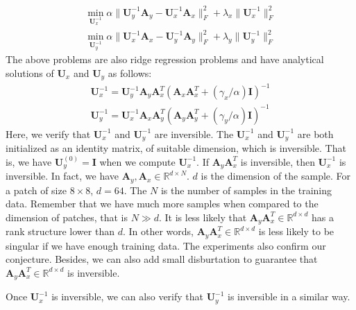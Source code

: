 \documentclass[10pt,twocolumn,letterpaper]{article}
\begin{document}
\begin{equation}
\begin{split}
\min_{\mathbf{U}_{x}^{-1}}
\alpha
\|\mathbf{U}_{y}^{-1}\mathbf{A}_{y}-\mathbf{U}_{x}^{-1}\mathbf{A}_{x}\|_{F}^{2}
+
\lambda_{x}\|\mathbf{U}_{x}^{-1}\|_{F}^{2}
\\
\min_{\mathbf{U}_{y}^{-1}}
\alpha
\|\mathbf{U}_{x}^{-1}\mathbf{A}_{x}-\mathbf{U}_{y}^{-1}\mathbf{A}_{y}\|_{F}^{2}
+
\lambda_{y}\|\mathbf{U}_{y}^{-1}\|_{F}^{2}
\end{split}
\end{equation}
The above problems are also ridge regression problems and have analytical solutions of $\mathbf{U}_{x}$ and $\mathbf{U}_{y}$ as follows:
\begin{equation}
\begin{split}
\mathbf{U}_{x}^{-1} = \mathbf{U}_{y}^{-1}\mathbf{A}_{y}\mathbf{A}_{x}^{T}(\mathbf{A}_{x}\mathbf{A}_{x}^{T}+(\gamma_{x}/\alpha)\mathbf{I})^{-1}
\\
\mathbf{U}_{y}^{-1} = \mathbf{U}_{x}^{-1}\mathbf{A}_{x}\mathbf{A}_{y}^{T}(\mathbf{A}_{y}\mathbf{A}_{y}^{T}+(\gamma_{y}/\alpha)\mathbf{I})^{-1}
\end{split}
\end{equation}
Here, we verify that $\mathbf{U}_{x}^{-1}$ and $\mathbf{U}_{y}^{-1}$ are inversible. The $\mathbf{U}_{x}^{-1}$ and $\mathbf{U}_{y}^{-1}$ are both initialized as an identity matrix, of suitable dimension, which is inversible. That is, we have $\mathbf{U}_{y}^{(0)} = \mathbf{I}$ when we compute $\mathbf{U}_{x}^{-1}$. If $\mathbf{A}_{y}\mathbf{A}_{x}^{T}$ is inversible, then $\mathbf{U}_{x}^{-1}$ is inversible. In fact, we have $\mathbf{A}_{y},\mathbf{A}_{x}\in \mathbb{R}^{d\times N}$. $d$ is the dimension of the sample. For a patch of size $8\times8$, $d=64$. The $N$ is the number of samples in the training data. Remember that we have much more samples when compared to the dimension of patches, that is $N\gg d$. It is less likely that  $\mathbf{A}_{y}\mathbf{A}_{x}^{T}\in \mathbb{R}^{d\times d}$ has a rank structure lower than $d$. In other words,  $\mathbf{A}_{y}\mathbf{A}_{x}^{T}\in \mathbb{R}^{d\times d}$ is less likely to be singular if we have enough training data. The experiments also confirm our conjecture. Besides, we can also add small disburtation to guarantee that $\mathbf{A}_{y}\mathbf{A}_{x}^{T}\in \mathbb{R}^{d\times d}$ is inversible. 

Once $\mathbf{U}_{x}^{-1}$ is inversible, we can also verify that $\mathbf{U}_{y}^{-1}$ is inversible in a similar way. 
\end{document}
